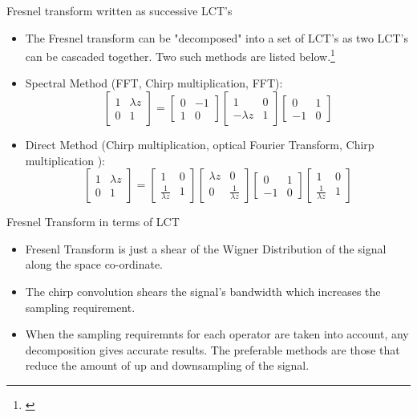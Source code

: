 \documentclass{beamer}
\begin{document}
\begin{frame}{Fresnel transform written as successive LCT's}
\begin{itemize}
	\item The Fresnel transform can be "decomposed" into a set of LCT's as two LCT's can be cascaded together. Two such methods are listed below.\footnote{\cite{Hennelly05}}
	\item Spectral Method (FFT, Chirp multiplication, FFT):
			\[
	\begin{bmatrix}
	1 & \lambda z \\
	0 & 1
	\end{bmatrix}
	=
	\begin{bmatrix}
	0 & -1 \\
	1 & 0
	\end{bmatrix}		
	\begin{bmatrix}
	1 & 0 \\
	-\lambda z & 1
	\end{bmatrix}	
	\begin{bmatrix}
	0 & 1 \\
	-1 & 0
	\end{bmatrix}			
	\]
	\item Direct Method (Chirp multiplication, optical Fourier Transform, Chirp multiplication ):
	\[
	\begin{bmatrix}
	1 & \lambda z \\
	0 & 1
	\end{bmatrix}
	=
	\begin{bmatrix}
	1 & 0 \\
	\frac{1}{\lambda z} & 1
	\end{bmatrix}	
	\begin{bmatrix}
	\lambda z & 0 \\
	0 & \frac{1}{\lambda z	}
	\end{bmatrix}			
	\begin{bmatrix}
	0 & 1\\
	-1 & 0
	\end{bmatrix}
		\begin{bmatrix}
	1 & 0 \\
	\frac{1}{\lambda z} & 1
	\end{bmatrix}	
	\]
	
\end{itemize}
\end{frame}

\begin{frame}{Fresnel Transform in terms of LCT}
\begin{itemize}
	\item Fresenl Transform is just a shear of the Wigner Distribution of the signal along the space co-ordinate.
\item The chirp convolution shears the signal's bandwidth which increases the sampling requirement. 
	\item When the sampling requiremnts for each operator are taken into account, any decomposition gives accurate results. The preferable methods are those that reduce the amount of up and downsampling of the signal.
\end{itemize}
\end{frame}
\end{document}

